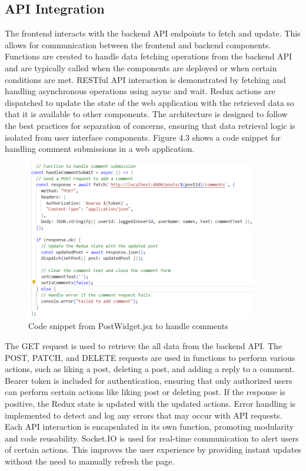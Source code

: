 \subsection{API Integration}
The frontend interacts with the backend API endpoints to fetch and update. This allows for communication between the frontend and backend components. Functions are created to handle data fetching operations from the backend API and are typically called when the components are deployed or when certain conditions are met. RESTful API interaction is demonstrated by fetching and handling asynchronous operations using async and wait. Redux actions are dispatched to update the state of the web application with the retrieved data so that it is available to other components. The architecture is designed to follow the best practices for separation of concerns, ensuring that data retrieval logic is isolated from user interface components. Figure 4.3 shows a code snippet for handling comment submissions in a web application.
\begin{figure}[h!]
    \centering
    \includegraphics[width=0.9\textwidth]{images/function.PNG}
    \caption{Code snippet from PostWidget.jsx to handle comments}
    \label{fig:comment-function}
\end{figure}

The GET request is used to retrieve the all data from the backend API. The POST, PATCH, and DELETE requests are used in functions to perform various actions, such as liking a post, deleting a post, and adding a reply to a comment. Bearer token is included for authentication, ensuring that only authorized users can perform certain actions like liking post or deleting post. If the response is positive, the Redux state is updated with the updated actions. Error handling is implemented to detect and log any errors that may occur with API requests. Each API interaction is encapsulated in its own function, promoting modularity and code reusability. Socket.IO is used for real-time communication to alert users of certain actions. This improves the user experience by providing instant updates without the need to manually refresh the page. 


